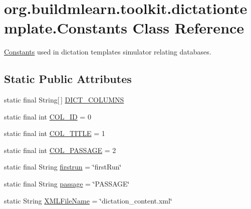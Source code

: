 \hypertarget{classorg_1_1buildmlearn_1_1toolkit_1_1dictationtemplate_1_1Constants}{}\section{org.\+buildmlearn.\+toolkit.\+dictationtemplate.\+Constants Class Reference}
\label{classorg_1_1buildmlearn_1_1toolkit_1_1dictationtemplate_1_1Constants}


\hyperlink{classorg_1_1buildmlearn_1_1toolkit_1_1dictationtemplate_1_1Constants}{Constants} used in dictation template\textquotesingle{}s simulator relating databases.  


\subsection*{Static Public Attributes}
\begin{DoxyCompactItemize}
\item 
static final String\mbox{[}$\,$\mbox{]} \hyperlink{classorg_1_1buildmlearn_1_1toolkit_1_1dictationtemplate_1_1Constants_a7d6d1315519509c36c62e79fdadafc56}{D\+I\+C\+T\+\_\+\+C\+O\+L\+U\+M\+NS}
\item 
static final int \hyperlink{classorg_1_1buildmlearn_1_1toolkit_1_1dictationtemplate_1_1Constants_a1a052a43d36f765d86f87201111b4d00}{C\+O\+L\+\_\+\+ID} = 0
\item 
static final int \hyperlink{classorg_1_1buildmlearn_1_1toolkit_1_1dictationtemplate_1_1Constants_a9e22c3060e736b3863bc5f5f039b6942}{C\+O\+L\+\_\+\+T\+I\+T\+LE} = 1
\item 
static final int \hyperlink{classorg_1_1buildmlearn_1_1toolkit_1_1dictationtemplate_1_1Constants_adfcb7c2ba2a9860f45b035723abcf95a}{C\+O\+L\+\_\+\+P\+A\+S\+S\+A\+GE} = 2
\item 
static final String \hyperlink{classorg_1_1buildmlearn_1_1toolkit_1_1dictationtemplate_1_1Constants_a530737f36d6c28029c8c8db6c4973353}{firstrun} = \char`\"{}first\+Run\char`\"{}
\item 
static final String \hyperlink{classorg_1_1buildmlearn_1_1toolkit_1_1dictationtemplate_1_1Constants_a273ce175a82ae2698e62ab35e9ff3c4c}{passage} = \char`\"{}P\+A\+S\+S\+A\+GE\char`\"{}
\item 
static String \hyperlink{classorg_1_1buildmlearn_1_1toolkit_1_1dictationtemplate_1_1Constants_a4341dc3ae5bf3c1cb74ade3143967c2f}{X\+M\+L\+File\+Name} = \char`\"{}dictation\+\_\+content.\+xml\char`\"{}
\end{DoxyCompactItemize}


